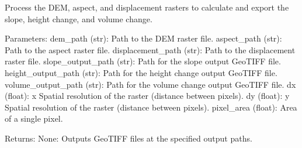 \documentclass[letterpaper,10pt,english]{sphinxmanual}
\begin{document}

\begin{fulllineitems}
\label{\detokenize{akhdefo_functions:akhdefo_functions.Akhdefo_Tools.displacement_to_volume}}
\pysigstartsignatures
{}
\pysigstopsignatures
\sphinxAtStartPar
Process the DEM, aspect, and displacement rasters to calculate and export the slope, height change, and volume change.

\sphinxAtStartPar
Parameters:
dem\_path (str): Path to the DEM raster file.
aspect\_path (str): Path to the aspect raster file.
displacement\_path (str): Path to the displacement raster file.
slope\_output\_path (str): Path for the slope output GeoTIFF file.
height\_output\_path (str): Path for the height change output GeoTIFF file.
volume\_output\_path (str): Path for the volume change output GeoTIFF file.
dx (float):  x Spatial resolution of the raster (distance between pixels).
dy (float):  y Spatial resolution of the raster (distance between pixels).
pixel\_area (float): Area of a single pixel.

\sphinxAtStartPar
Returns:
None: Outputs GeoTIFF files at the specified output paths.

\end{fulllineitems}
\end{document}
